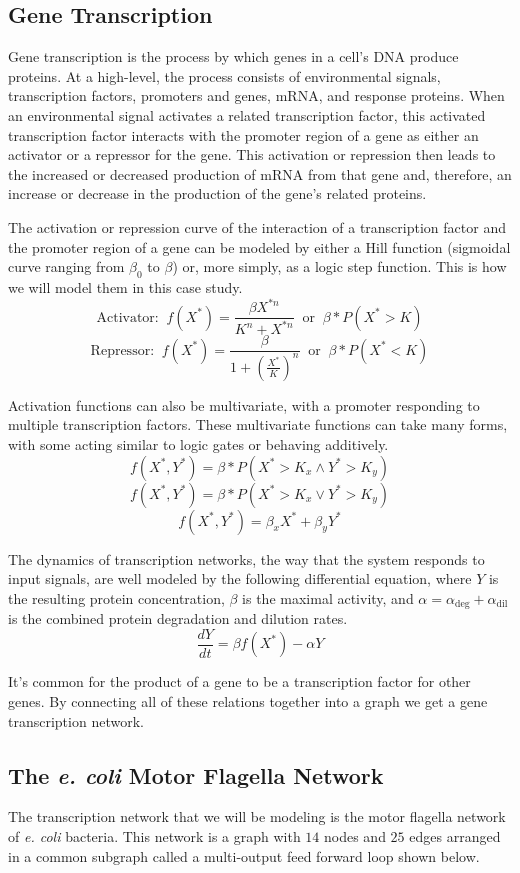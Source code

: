\documentclass[12pt]{article}
\begin{document}
\subsection*{Gene Transcription}
Gene transcription is the process by which genes in a cell's DNA produce proteins.
At a high-level, the process consists of environmental signals, transcription factors, promoters and genes, mRNA, and response proteins.
When an environmental signal activates a related transcription factor, this activated transcription factor interacts with the promoter region of a gene as either an activator or a repressor for the gene.
This activation or repression then leads to the increased or decreased production of mRNA from that gene and, therefore, an increase or decrease in the production of the gene's related proteins.

The activation or repression curve of the interaction of a transcription factor and the promoter region of a gene can be modeled by either a Hill function (sigmoidal curve ranging from $\beta_0$ to $\beta$) or, more simply, as a logic step function.
This is how we will model them in this case study.
$$\text{Activator: } \ f(X^*)=\frac{\beta X^{*n}}{K^n + X^{*n}} \ \text{ or } \ \beta * P(X^* > K)$$
$$\text{Repressor: } \ f(X^*)=\frac{\beta}{1 + \left(\frac{X^*}{K}\right)^n} \ \text{ or } \ \beta * P(X^* < K)$$

Activation functions can also be multivariate, with a promoter responding to multiple transcription factors.
These multivariate functions can take many forms, with some acting similar to logic gates or behaving additively.
$$f(X^*, Y^*)=\beta*P(X^* > K_x \land Y^* > K_y)$$
$$f(X^*, Y^*)=\beta*P(X^* > K_x \lor Y^* > K_y)$$
$$f(X^*, Y^*)=\beta_x X^* + \beta_y Y^*$$

The dynamics of transcription networks, the way that the system responds to input signals, are well modeled by the following differential equation, where $Y$ is the resulting protein concentration, $\beta$ is the maximal activity, and $\alpha=\alpha_{\text{deg}} + \alpha_{\text{dil}}$ is the combined protein degradation and dilution rates.
$$\frac{dY}{dt}=\beta f(X^*) - \alpha Y$$

It's common for the product of a gene to be a transcription factor for other genes.
By connecting all of these relations together into a graph we get a gene transcription network.



\subsection*{The \textit{e. coli} Motor Flagella Network}
The transcription network that we will be modeling is the motor flagella network of \textit{e. coli} bacteria.
This network is a graph with $14$ nodes and $25$ edges arranged in a common subgraph called a multi-output feed forward loop shown below.
\end{document}
